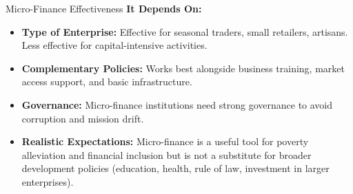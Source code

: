 \documentclass[11pt, a4paper, twoside]{book}
\begin{document}
\begin{evaluation}{Micro-Finance Effectiveness}
\textbf{It Depends On:}
\begin{itemize}
  \item \textbf{Type of Enterprise:} Effective for seasonal traders, small retailers, artisans. Less effective for capital-intensive activities.
  \item \textbf{Complementary Policies:} Works best alongside business training, market access support, and basic infrastructure.
  \item \textbf{Governance:} Micro-finance institutions need strong governance to avoid corruption and mission drift.
  \item \textbf{Realistic Expectations:} Micro-finance is a useful tool for poverty alleviation and financial inclusion but is not a substitute for broader development policies (education, health, rule of law, investment in larger enterprises).
\end{itemize}
\end{evaluation}
\end{document}

